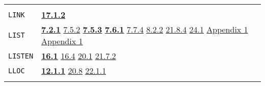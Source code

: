 \documentclass[a4paper]{scrbook}
\begin{document}
\begin{longtable}[]{@{}ll@{}}
\begin{minipage}[t]{0.70\columnwidth}
\end{minipage}\tabularnewline
\begin{minipage}[t]{0.24\columnwidth}\raggedright\strut
\texttt{LINK}\strut
\end{minipage} & \begin{minipage}[t]{0.70\columnwidth}\raggedright\strut
\textbf{\href{17-macro-operations.md\#1712-link}{17.1.2}}\strut
\end{minipage}\tabularnewline
\begin{minipage}[t]{0.24\columnwidth}\raggedright\strut
\texttt{LIST}\strut
\end{minipage} & \begin{minipage}[t]{0.70\columnwidth}\raggedright\strut
\textbf{\href{07-structured-objects.md\#721-list-1}{7.2.1}} \href{07-structured-objects.md\#752-quote-1}{7.5.2}
\textbf{\href{07-structured-objects.md\#753-list-vector-uvector-and-string-the-subrs-1}{7.5.3}}
\textbf{\href{07-structured-objects.md\#761-list-the-primtype-1}{7.6.1}}
\href{07-structured-objects.md\#774-note-on-efficiency-1}{7.7.4} \href{08-truth.md\#822-equality-and-membership-1}{8.2.2}
\href{21-interrupts.md\#2184-gc}{21.8.4} \href{24-efficiency-and-tastefulness.md\#241-efficiency}{24.1}
\href{appendix-1-a-look-inside.md\#appendix-1-a-look-inside}{Appendix 1}
\href{appendix-1-a-look-inside.md\#basic-data-structures}{Appendix 1}\strut
\end{minipage}\tabularnewline
\begin{minipage}[t]{0.24\columnwidth}\raggedright\strut
\texttt{LISTEN}\strut
\end{minipage} & \begin{minipage}[t]{0.70\columnwidth}\raggedright\strut
\textbf{\href{16-errors-frames-etc.md\#161-listen}{16.1}} \href{16-errors-frames-etc.md\#164-erret}{16.4}
\href{20-coroutines.md\#201-process-the-type}{20.1} \href{21-interrupts.md\#2172-int-level}{21.7.2}\strut
\end{minipage}\tabularnewline
\begin{minipage}[t]{0.24\columnwidth}\raggedright\strut
\texttt{LLOC}\strut
\end{minipage} & \begin{minipage}[t]{0.70\columnwidth}\raggedright\strut
\textbf{\href{12-locatives.md\#1211-lloc}{12.1.1}} \href{20-coroutines.md\#208-sneakiness-with-processes}{20.8}
\href{22-storage-management.md\#2211-stacks-and-other-internal-vectors}{22.1.1}\strut
\end{minipage}\tabularnewline
\begin{minipage}[t]{0.24\columnwidth}\raggedright\strut

\end{minipage}
\end{longtable}
\end{document}

